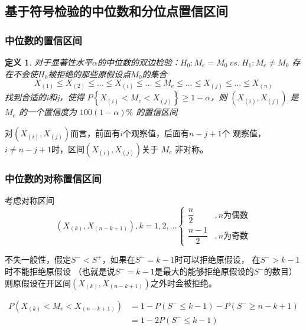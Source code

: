\documentclass[UTF8]{ctexart}
\numberwithin{equation}{section}
\newtheorem{definition}{定义}[section]
\begin{document}
\subsection{基于符号检验的中位数和分位点置信区间}
\subsubsection{中位数的置信区间}
\begin{definition}
    对于显著性水平$\alpha$的中位数的双边检验：$H_0:M_e = M_0~vs.~H_1:M_e \neq M_0$
    存在不会使$H_0$被拒绝的那些原假设点$M_0$的集合
    \begin{equation}
        X_{(1)} \leq X_{(2)} \leq \dots \leq X_{(i)} \leq \dots \leq M_e \leq \dots \leq X_{(j)} \leq \dots \leq X_{(n)}
        \nonumber
    \end{equation}
    找到合适的i和j，使得 $P \left\{ X_{(i)} < M_e < X_{(j)} \right\} \geq 1 - \alpha$，则 $(X_{(i)}, X_{(j)})$ 是 $M_e$ 的一个置信度为 $100(1 - \alpha) \%$ 的置信区间
\end{definition}

对$(X_{(i)} ,X_{(j)})$而言，前面有$i$个观察值，后面有$n-j+1$个
观察值，$i \neq n-j+1$时，区间$(X_{(i)} ,X_{(j)})$关于 $M_e$ 非对称。

\subsubsection{中位数的对称置信区间}
考虑对称区间
\begin{equation}
    (X_{(k)} ,X_{(n-k+1)}),k = 1,2,\dots 
    \begin{cases}
        \dfrac{n}{2} &, n \mbox{为偶数} \\[1em]
        \dfrac{n-1}{2} &, n \mbox{为奇数}
    \end{cases}
    \nonumber
\end{equation}

不失一般性，假定$S^{-} < S^{+}$，如果在$S^- = k-1$时可以拒绝原假设，
在$S^- > k-1$时不能拒绝原假设
（也就是说$S^- = k-1$是最大的能够拒绝原假设的$S^-$的数目）
则原假设在开区间$(X_{(k)} ,X_{(n-k+1)})$之外时会被拒绝。

\begin{equation}
    \begin{split}
        P(X_{(k)} < M_e < X_{(n-k+1)}) 
        & = 1 - P(S^- \leq k-1) - P(S^- \geq n-k+1) \\
        & = 1 - 2P(S^- \leq k-1)
    \end{split}
    \nonumber
\end{equation}
\end{document}

